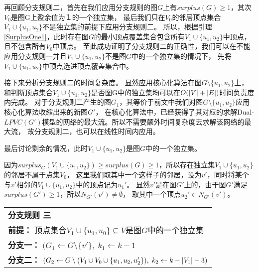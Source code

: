 再回顾分支规则二，首先在我们应用分支规则的图$G$上有$surplus(G) \ge 1$，其次$V_0$是图G上盈余值为１的一个独立集，
最后我们只在$V_0$的邻居顶点集合$V_1 \cup \{u_1, u_2\}$不是独立集的前提下应用分支规则二。
所以，根据引理\ref{SurplusOne1}，此时存在图$G$的最小顶点覆盖集合包含所有$V_1 \cup \{u_1, u_2\}$中顶点，且不包含所有$V_0$中顶点。
至此成功证明了分支规则二的正确性，我们可以在不能应用分支规则一并且$V_1 \cup \{u_1, u_2\}$不是图$G$中的一个独立集的情况下，
先将$V_1 \cup \{u_1, u_2\}$中顶点选进顶点覆盖集合中。

接下来分析分支规则二的时间复杂度。
显然应用核心化算法在图$G \setminus \{u_1, u_2\}$上，
和判断顶点集合$V_1 \cup \{u_1, u_2\}$是否图G中的独立集均可以在$O(\left\vert V \right\vert + \left\vert E \right\vert)$时间负责度内完成。
对于分支规则二产生的图$G_1$，其等价于前文中我们对图$G \setminus \{u_1, u_2\}$应用核心化算法收缩出来的新图$G'$，
在核心化算法中，已经获得了其对应的求解Dual-$LPVC(G')$模型的网络的最大流。所以不需要额外时间复杂度去求解该网络的最大流，
故分支规则二，也可以在线性时间内应用。

最后讨论剩余的情况，此时$V_1 \cup \{u_1, u_2\}$是图$G$中的一个独立集。

因为$surplus_G(V_1 \cup \{u_1, u_2\}) \ge surplus(G) \ge 1$，所以存在独立集$V_1 \cup \{u_1, u_2\}$的邻居不属于点集$V_0$，
这里我们取其中一个这样子的邻居，设为$v'$，同时将某个与$v'$相邻的$V_1 \cup \{u_1, u_2\}$中的顶点记为$u_1'$。
显然$v'$是在图$G'$上的，由于图$G'$满足$surplus(G') \ge 1$，所以$N_{G'}(v') \neq \emptyset$，
取其中一个顶点$u_2' \in N_{G'}(v')$。\\

\begin{tabular}{ p{0.9\headwidth} }
  \hline
  \textbf{分支规则 三 }\\
  \textbf{前提：} 顶点集合$V_1 \cup \{u_1, u_0\}\subseteq V$是图$G$中的一个独立集 \\
  \textbf{分支一：} $(G_1 \leftarrow G \setminus \{v'\},\; k_1 \leftarrow k - 1$\\
  \textbf{分支二：} $(G_2 \leftarrow G \setminus (V_1\cup V_0  \cup \{u_1, u_2, u_2'\}) ,\; k_2 \leftarrow k - \left\vert V_1 \right\vert - 3)$\\
  \hline
\end{tabular} \vspace{0.5cm}

